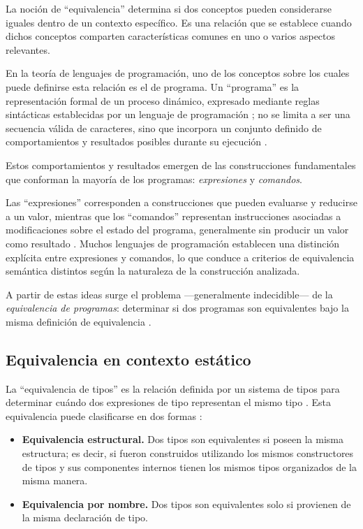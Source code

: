 La noción de \enquote{equivalencia} determina si dos conceptos pueden considerarse iguales dentro de un  contexto específico. Es una relación que se establece cuando dichos conceptos comparten características comunes en uno o varios aspectos relevantes.

En la teoría de lenguajes de programación, uno de los conceptos sobre los cuales puede definirse esta relación es el de programa. Un \enquote{programa} es la representación formal de un proceso dinámico, expresado mediante reglas sintácticas establecidas por un lenguaje de programación \cite{abelson1996sicp}; no se limita a ser una secuencia válida de caracteres, sino que incorpora un conjunto definido de comportamientos y  resultados posibles durante su ejecución \cite{lamport1985axiomatic}. 

Estos comportamientos y resultados emergen de las construcciones fundamentales que conforman la mayoría de los programas: \emph{expresiones} y \emph{comandos}. 


Las \enquote{expresiones} corresponden a construcciones que pueden evaluarse y reducirse a un valor, mientras que los \enquote{comandos} representan instrucciones asociadas a modificaciones sobre el estado del programa, generalmente sin producir un valor como resultado \cite{tozzi2025statementexpression}. 
Muchos lenguajes de programación establecen una distinción explícita entre expresiones y comandos, lo que conduce a criterios de equivalencia semántica distintos según la naturaleza de la construcción analizada.


A partir de estas ideas surge el problema ---generalmente indecidible--- de la \emph{equivalencia de programas}: determinar si dos programas son equivalentes bajo la misma definición de equivalencia \cite{lahiri2018program}.


\subsection{Equivalencia en contexto estático}
La \enquote{equivalencia de tipos} es la relación definida por un sistema de tipos para determinar cuándo dos expresiones de tipo representan el mismo tipo \cite{fiveable_type_equivalence}. Esta equivalencia puede clasificarse en dos formas \cite{louden2020programming}:

\begin{itemize}
\item \textbf{Equivalencia estructural.} 
Dos tipos son equivalentes si poseen la misma estructura; es decir, si fueron construidos utilizando los mismos constructores de tipos y sus componentes internos tienen los mismos tipos organizados de la misma manera.

\item \textbf{Equivalencia por nombre.} Dos tipos son equivalentes solo si provienen de la misma declaración de tipo.
\end{itemize}


